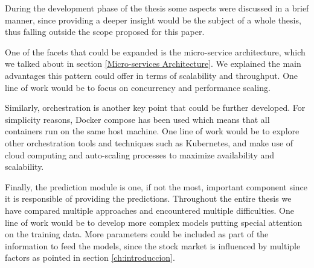 During the development phase of the thesis some aspects were discussed in a brief manner, since providing a deeper insight would be the subject of a whole thesis, thus falling outside the scope proposed for this paper.

One of the facets that could be expanded is the micro-service architecture, which we talked about in section \ref{Micro-services Architecture}. We explained the main advantages this pattern could offer in terms of scalability and throughput. One line of work would be to focus on concurrency and performance scaling.

Similarly, orchestration is another key point that could be further developed. For simplicity reasons, Docker compose has been used which means that all containers run on the same host machine. One line of work would be to explore other orchestration tools and techniques such as Kubernetes, and make use of cloud computing and auto-scaling processes to maximize availability and scalability.

Finally, the prediction module is one, if not the most, important component since it is responsible of providing the predictions. Throughout the entire thesis we have compared multiple approaches and encountered multiple difficulties. One line of work would be to develop more complex models putting special attention on the training data. More parameters could be included as part of the information to feed the models, since the stock market is influenced by multiple factors as pointed in section \ref{ch:introduccion}.